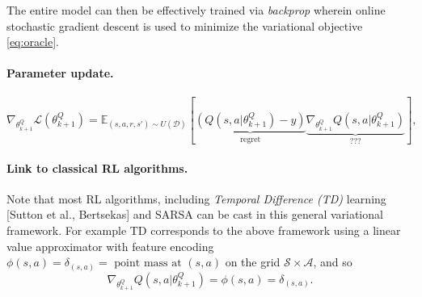 \documentclass{article} %
\begin{document}
The entire model can then be effectively trained via \textit{backprop} wherein online stochastic
gradient descent is used to minimize the variational objective \eqref{eq:oracle}.

\paragraph{Parameter update.}
\begin{equation}
  \nabla_{\theta^Q_{k+1}}\mathcal L(\theta^Q_{k+1})
  = \mathbb E_{(s, a, r, s') \sim U(\mathcal D)}\left[\underbrace{(Q(s, a|\theta^Q_{k+1}) - y)}_{\text{regret}}
    \underbrace{\nabla_{\theta^Q_{k+1}}Q(s, a|\theta^Q_{k+1})}_{\text{???}}\right],
  \label{eq:oracle}
\end{equation}

\paragraph{Link to classical RL algorithms.}
Note that most RL algorithms, including \textit{Temporal Difference (TD)} learning [Sutton et al.,
  Bertsekas] and SARSA can be cast in this general variational framework. For example TD corresponds
to the above framework using a linear value approximator with feature encoding
$\phi(s,a) = \delta_{(s,a)} =  \text{ point mass at }(s,a)$ on the grid $\mathcal S \times \mathcal A$,
and so $$\nabla_{\theta^Q_{k+1}}Q(s, a|\theta^Q_{k+1}) = \phi(s, a) = \delta_{(s,a)}.$$
\end{document}
